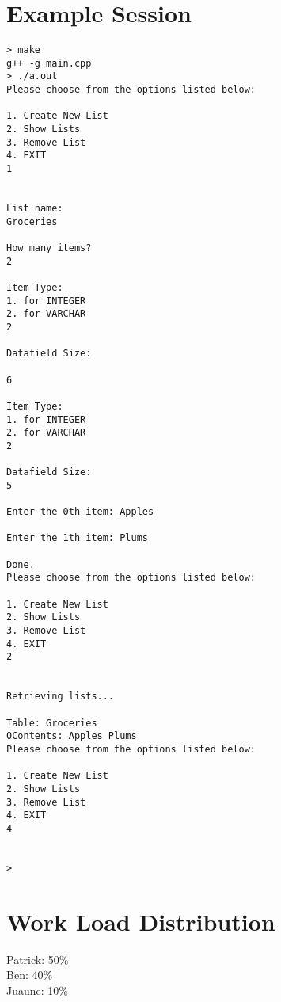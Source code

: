 \documentclass{article}
\begin{document}
\section{Example Session}
\begin{verbatim}
> make
g++ -g main.cpp
> ./a.out
Please choose from the options listed below: 

1. Create New List 
2. Show Lists 
3. Remove List 
4. EXIT 
1


List name:
Groceries

How many items?
2

Item Type:
1. for INTEGER
2. for VARCHAR
2

Datafield Size:

6

Item Type:
1. for INTEGER
2. for VARCHAR
2

Datafield Size:
5

Enter the 0th item: Apples

Enter the 1th item: Plums

Done.
Please choose from the options listed below: 

1. Create New List 
2. Show Lists 
3. Remove List 
4. EXIT 
2


Retrieving lists...

Table: Groceries
0Contents: Apples Plums 
Please choose from the options listed below: 

1. Create New List 
2. Show Lists 
3. Remove List 
4. EXIT 
4


>
\end{verbatim}

\section{Work Load Distribution}
Patrick: 50\%\\
Ben:     40\%\\
Juaune:  10\%\\
\end{document}
